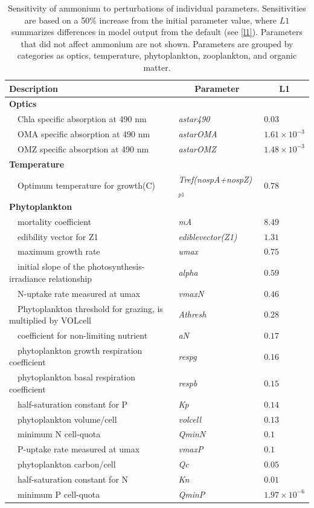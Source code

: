 \documentclass[letterpaper,12pt,oneside]{article}\usepackage[]{graphicx}\usepackage[]{color}
\begin{document}
\begin{table}[!tbp]
{\footnotesize
\caption{Sensitivity of ammonium to perturbations of individual parameters.  Sensitivities are based on a 50\% increase from the initial parameter value, where $L1$ summarizes differences in model output from the default (see \cref{l1}).  Parameters that did not affect ammonium are not shown.  Parameters are grouped by categories as optics, temperature, phytoplankton, zooplankton, and organic matter.\label{tab:nh4sens}} 
\begin{center}
\begin{tabular}{lll}
\hline\hline
\multicolumn{1}{l}{Description}&\multicolumn{1}{c}{Parameter}&\multicolumn{1}{c}{L1}\tabularnewline
\hline
{\bfseries Optics}&&\tabularnewline
~~Chla specific absorption at 490 nm&\textit{astar490}&$0.03$\tabularnewline
~~OMA specific absorption at 490 nm&\textit{astarOMA}&$1.61\times 10^{-3}$\tabularnewline
~~OMZ specific absorption at 490 nm&\textit{astarOMZ}&$1.48\times 10^{-3}$\tabularnewline
\hline
{\bfseries Temperature}&&\tabularnewline
~~Optimum temperature for growth(C)&\textit{Tref(nospA+nospZ)$_{p1}$}&$0.78$\tabularnewline
\hline
{\bfseries Phytoplankton}&&\tabularnewline
~~mortality coefficient&\textit{mA}&$8.49$\tabularnewline
~~edibility vector for Z1&\textit{ediblevector(Z1)}&$1.31$\tabularnewline
~~maximum growth rate&\textit{umax}&$0.75$\tabularnewline
~~initial slope of the photosynthesis-irradiance relationship&\textit{alpha}&$0.59$\tabularnewline
~~N-uptake rate measured at umax&\textit{vmaxN}&$0.46$\tabularnewline
~~Phytoplankton threshold for grazing, is multiplied by VOLcell&\textit{Athresh}&$0.28$\tabularnewline
~~coefficient for non-limiting nutrient&\textit{aN}&$0.17$\tabularnewline
~~phytoplankton growth respiration coefficient&\textit{respg}&$0.16$\tabularnewline
~~phytoplankton basal respiration coefficient&\textit{respb}&$0.15$\tabularnewline
~~half-saturation constant for P&\textit{Kp}&$0.14$\tabularnewline
~~phytoplankton volume/cell&\textit{volcell}&$0.13$\tabularnewline
~~minimum N cell-quota&\textit{QminN}&$0.1$\tabularnewline
~~P-uptake rate measured at umax&\textit{vmaxP}&$0.1$\tabularnewline
~~phytoplankton carbon/cell&\textit{Qc}&$0.05$\tabularnewline
~~half-saturation constant for N&\textit{Kn}&$0.01$\tabularnewline
~~minimum P cell-quota&\textit{QminP}&$1.97\times 10^{-6}$\tabularnewline

\end{tabular}
\end{center}}
\end{table}
\end{document}
